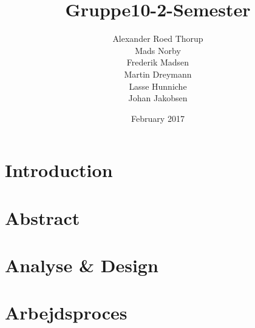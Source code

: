 \documentclass{article}
\title{Gruppe10-2-Semester}
\author{Alexander Roed Thorup \\Mads Norby \\Frederik Madsen \\Martin Dreymann \\Lasse Hunniche \\Johan Jakobsen}
\date{February 2017}
\begin{document}
\maketitle

\section{Introduction}
\section{Abstract}
\section{Analyse \& Design}
\section{Arbejdsproces}
\end{document}
